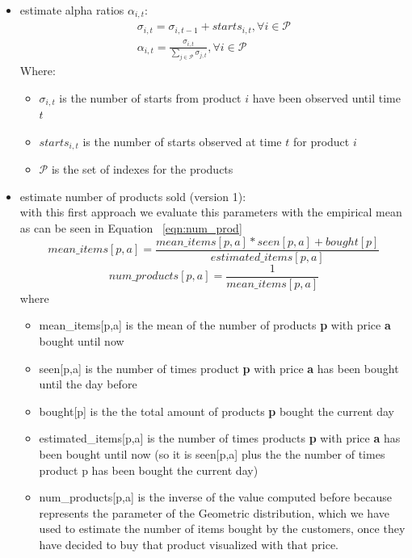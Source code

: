 \begin{itemize}
    \item estimate alpha ratios $\alpha_{i, t}$:
    \begin{align}
        \sigma_{i, t} = \sigma_{i, t - 1} + starts_{i, t}, \forall i \in \mathcal{P}\\
        \alpha_{i, t} = \frac{\sigma_{i, t}}{\sum_{j \in \mathcal{P}}\sigma_{j, t}},  \forall i \in \mathcal{P}
        \label{eqn:alpha}
    \end{align}Where:\begin{itemize}
        \item $\sigma_{i, t}$ is the number of starts from product $i$ have been observed until time $t$
        \item $starts_{i, t}$ is the number of starts observed at time $t$ for product $i$
        \item $\mathcal{P}$ is the set of indexes for the products
        \end{itemize}  
    \item estimate number of products sold (version 1):\\
    with this first approach we evaluate this parameters with the empirical mean as can be seen in Equation ~\ref{eqn:num_prod} \begin{equation}
        \label{eqn:mean_items}
        mean\_items[p,a] = \frac{mean\_items[p,a] * seen[p,a] + bought[p]}{estimated\_items[p,a]}
    \end{equation}\begin{equation}
        \label{eqn:num_prod}
        num\_products[p,a] = \frac{1}{mean\_items[p,a]}
    \end{equation}where\begin{itemize}
        \item mean\_items[p,a] is the mean of the number of products {\bf p} with price {\bf a} bought until now
        \item seen[p,a] is the number of times product {\bf p} with price {\bf a} has been bought until the day before
        \item bought[p] is the the total amount of products {\bf p} bought the current day
        \item estimated\_items[p,a] is the number of times products {\bf p} with price {\bf a} has been bought until now (so it is seen[p,a] plus the the number of times product p has been bought the current day)
        \item num\_products[p,a] is the inverse of the value computed before because represents the parameter of the Geometric distribution, which we have used to estimate the number of items bought by the customers, once they have decided to buy that product visualized with that price.

\end{itemize}
\end{itemize}
